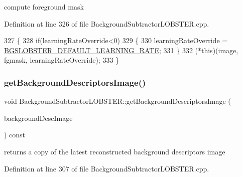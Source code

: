 compute foreground mask 



Definition at line 326 of file Background\+Subtractor\+L\+O\+B\+S\+T\+E\+R.\+cpp.


\begin{DoxyCode}
327 \{
328     \textcolor{keywordflow}{if}(learningRateOverride<0)
329     \{
330         learningRateOverride = \mbox{\hyperlink{_background_subtractor_l_o_b_s_t_e_r_8h_a2d317f4a065c4c58c7241080d9c4457c}{BGSLOBSTER\_DEFAULT\_LEARNING\_RATE}};
331     \}
332     (*this)(image, fgmask, learningRateOverride);
333 \}
\end{DoxyCode}
\mbox{\label{class_background_subtractor_l_o_b_s_t_e_r_a28b005819f237ece74ab9eeacef8d770}} 
\subsubsection{\texorpdfstring{get\+Background\+Descriptors\+Image()}{getBackgroundDescriptorsImage()}}
{\footnotesize\ttfamily void Background\+Subtractor\+L\+O\+B\+S\+T\+E\+R\+::get\+Background\+Descriptors\+Image (\begin{DoxyParamCaption}\item[{cv\+::\+Output\+Array}]{background\+Desc\+Image }\end{DoxyParamCaption}) const\hspace{0.3cm}{\ttfamily [virtual]}}



returns a copy of the latest reconstructed background descriptors image 



Definition at line 307 of file Background\+Subtractor\+L\+O\+B\+S\+T\+E\+R.\+cpp.


